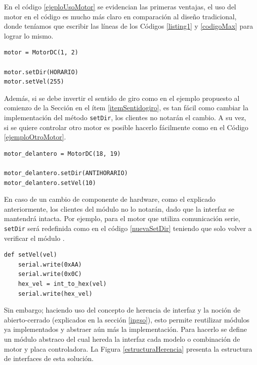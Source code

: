 En el código \ref{ejeploUsoMotor} se evidencian las primeras ventajas, el uso del motor en el código es mucho más claro en comparación al diseño tradicional, donde teníamos que escribir las líneas de los Códigos \ref{listing1} y \ref{codigoMax} para lograr lo mismo.

\begin{lstlisting}[caption=Ejemplo de uso de la interfaz del módulo MotorDC, label={ejeploUsoMotor}]
motor = MotorDC(1, 2)

motor.setDir(HORARIO)
motor.setVel(255)
\end{lstlisting}

Además, si se debe invertir el sentido de giro como en el ejemplo propuesto al comienzo de la Sección en el ítem \ref{itemSentidogiro}, es tan fácil como cambiar la implementación del método \verb|setDir|, los clientes no notarán el cambio. A su vez, si se quiere controlar otro motor es posible hacerlo fácilmente como en el Código \ref{ejemploOtroMotor}. 

\begin{lstlisting}[caption=Ejemplo control nuevo motor DC.,label={ejemploOtroMotor}]
motor_delantero = MotorDC(18, 19)

motor_delantero.setDir(ANTIHORARIO)
motor_delantero.setVel(10)
\end{lstlisting}


En caso de un cambio de componente de hardware, como el explicado anteriormente, los clientes del módulo no lo notarán, dado que la interfaz se mantendrá intacta. Por ejemplo, para el motor que utiliza comunicación serie, \verb|setDir| será redefinida como en el código \ref{nuevaSetDir} teniendo que solo volver a verificar el módulo \MotorDC.

\begin{lstlisting}[caption=Implementación método setVel para el motor que utiliza comunicación serie.,label={nuevaSetDir}]
def setVel(vel)
    serial.write(0xAA)
    serial.write(0x0C)
    hex_vel = int_to_hex(vel)
    serial.write(hex_vel)
\end{lstlisting}

Sin embargo; haciendo uso del concepto de herencia de interfaz y la noción de abierto-cerrado (explicados en la sección \ref{ingso}), esto permite reutilizar módulos ya implementados y abstraer aún más la implementación. Para hacerlo se define un módulo abstraco \textit{\MotorDC} del cual hereda la interfaz cada modelo o combinación de motor y placa controladora. La Figura \ref{estructuraHerencia} presenta la estructura de interfaces de esta solución.

